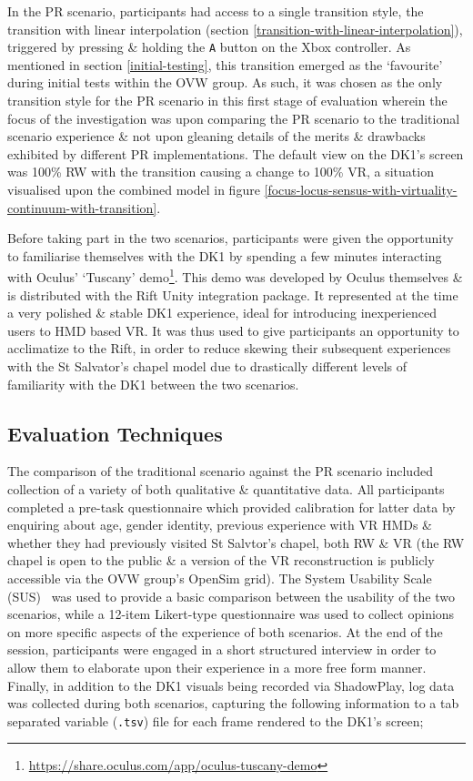 In the PR scenario, participants had access to a single transition style, the transition with linear interpolation (section \ref{transition-with-linear-interpolation}), triggered by pressing \& holding the \texttt{A} button on the Xbox controller. As mentioned in section \ref{initial-testing}, this transition emerged as the `favourite' during initial tests within the OVW group. As such, it was chosen as the only transition style for the PR scenario in this first stage of evaluation wherein the focus of the investigation was upon comparing the PR scenario to the traditional scenario experience \& not upon gleaning details of the merits \& drawbacks exhibited by different PR implementations. The default view on the DK1's screen was 100\% RW with the transition causing a change to 100\% VR, a situation visualised upon the combined model in figure \ref{focus-locus-sensus-with-virtuality-continuum-with-transition}.

Before taking part in the two scenarios, participants were given the opportunity to familiarise themselves with the DK1 by spending a few minutes interacting with Oculus' `Tuscany' demo\footnote{\url{https://share.oculus.com/app/oculus-tuscany-demo}}. This demo was developed by Oculus themselves \& is distributed with the Rift Unity integration package. It represented at the time a very polished \& stable DK1 experience, ideal for introducing inexperienced users to HMD based VR. It was thus used to give participants an opportunity to acclimatize to the Rift, in order to reduce skewing their subsequent experiences with the St Salvator's chapel model due to drastically different levels of familiarity with the DK1 between the two scenarios.


\subsection{Evaluation Techniques}

The comparison of the traditional scenario against the PR scenario included collection of a variety of both qualitative \& quantitative data. All participants completed a pre-task questionnaire which provided calibration for latter data by enquiring about age, gender identity, previous experience with VR HMDs \& whether they had previously visited St Salvtor's chapel, both RW \& VR (the RW chapel is open to the public \& a version of the VR reconstruction is publicly accessible via the OVW group's OpenSim grid). The System Usability Scale (SUS)~\cite{Brooke1996} was used to provide a basic comparison between the usability of the two scenarios, while a 12-item Likert-type questionnaire was used to collect opinions on more specific aspects of the experience of both scenarios. At the end of the session, participants were engaged in a short structured interview in order to allow them to elaborate upon their experience in a more free form manner. Finally, in addition to the DK1 visuals being recorded via ShadowPlay, log data was collected during both scenarios, capturing the following information to a tab separated variable (\texttt{.tsv}) file for each frame rendered to the DK1's screen;

